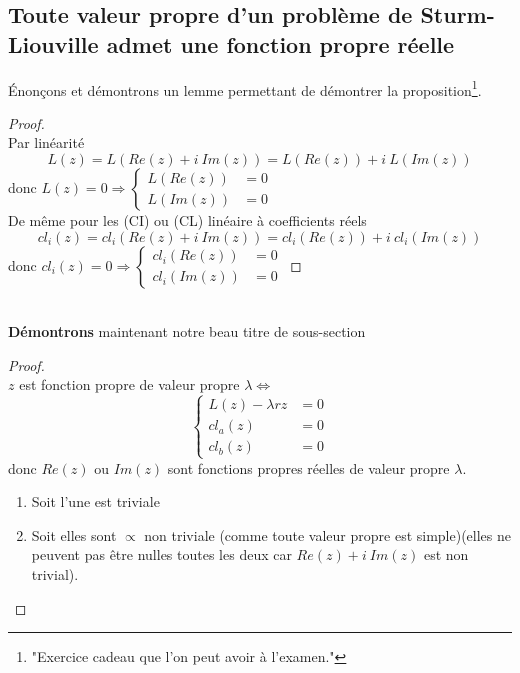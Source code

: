 \documentclass[british,french,11pt, a4paper, openany]{book}
\begin{document}
		\subsection{Toute valeur propre d'un problème de Sturm-Liouville admet une fonction propre réelle}
		Énonçons et démontrons un lemme permettant de démontrer la proposition\footnote{"Exercice cadeau que l'on peut avoir à l'examen."}.\\
		\begin{proof}
			\ \\
			Par linéarité
			\begin{equation}
				L(z) = L(Re(z) +i\ Im(z)) = L(Re(z)) +i\ L(Im(z))
			\end{equation}
			donc $L(z) = 0 \Rightarrow \left\{\begin{array}{ll}
			L(Re(z)) &=0\\
			L(Im(z)) &=0
			\end{array}\right.$\\
			De même pour les (CI) ou (CL) linéaire à coefficients réels
			\begin{equation}
				cl_i(z) = cl_i(Re(z) +i\ Im(z)) = cl_i(Re(z)) +i\ cl_i(Im(z))
			\end{equation}
			donc $cl_i(z) = 0 \Rightarrow \left\{\begin{array}{ll}
			cl_i(Re(z)) &=0\\
			cl_i(Im(z)) &=0
			\end{array}\right.$
		\end{proof}\ \\
													
		\newpage
		\textbf{Démontrons} maintenant notre beau titre de sous-section
		\begin{proof}
			\ \\
			$z$ est fonction propre de valeur propre $\lambda \Leftrightarrow$
			\begin{equation}
				\left\{\begin{array}{ll}
				L(z) - \lambda r z &=0\\
				cl_a(z) &=0\\
				cl_b(z) &=0
				\end{array}\right.
			\end{equation}
			donc $Re(z)$ ou $Im(z)$ sont fonctions propres réelles de valeur propre $\lambda$.
			\begin{enumerate}
				\item Soit l'une est triviale
				\item Soit elles sont $\propto$ non triviale (comme toute valeur propre est simple)(elles ne peuvent pas être nulles toutes les deux car $Re(z) + i\ Im(z)$ est non trivial).
			\end{enumerate}
		\end{proof}
													
\end{document}
